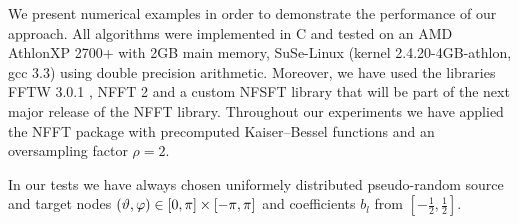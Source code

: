 We present numerical examples in order to demonstrate the performance of
our approach. All algorithms were implemented in C and tested on an 
AMD Athlon\texttrademark XP 2700+ with 2GB main memory, SuSe-Linux 
(kernel 2.4.20-4GB-athlon, gcc 3.3) using double precision arithmetic. 
Moreover, we have used the libraries FFTW 3.0.1 \cite{fftw}, NFFT 2
\cite{kupo02C} and a custom NFSFT library that will be part of the next 
major release of the NFFT library. Throughout our experiments we have 
applied the NFFT package \cite{kupo02C} with precomputed Kaiser--Bessel 
functions and an oversampling factor $\rho=2$.

In our tests we have always chosen uniformely distributed pseudo-random 
source and target nodes 
$\left(\vartheta,\varphi\right) \in [0,\pi] \times [-\pi,\pi]$ and 
coefficients $b_l$ from $\left[-\frac{1}{2},\frac{1}{2}\right]$.

